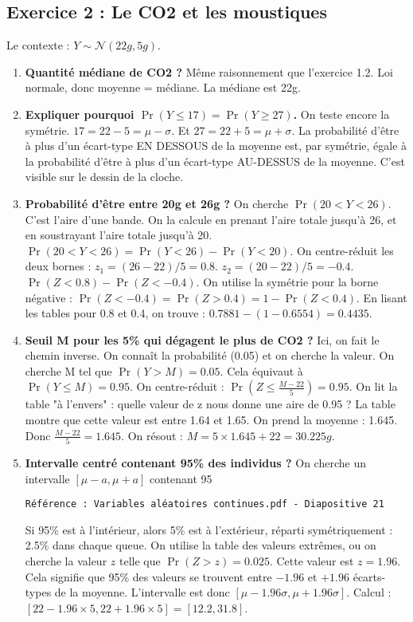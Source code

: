 \documentclass[12pt, a4paper]{article}
\newcommand{\slidenote}[1]{%
    \par\vspace{1.5ex}%
    \noindent\texttt{\small\color{gray}#1}\par\nopagebreak\vspace{1.5ex}%
}
\begin{document}
\subsection*{Exercice 2 : Le CO2 et les moustiques}
Le contexte : $Y \sim \mathcal{N}(22g, 5g)$.

\begin{enumerate}
    \item \textbf{Quantité médiane de CO2 ?} Même raisonnement que l'exercice 1.2. Loi normale, donc moyenne = médiane. La médiane est 22g.

    \item \textbf{Expliquer pourquoi $\Pr(Y \le 17) = \Pr(Y \ge 27)$.}
    On teste encore la symétrie. $17 = 22 - 5 = \mu - \sigma$. Et $27 = 22 + 5 = \mu + \sigma$.
    La probabilité d'être à plus d'un écart-type EN DESSOUS de la moyenne est, par symétrie, égale à la probabilité d'être à plus d'un écart-type AU-DESSUS de la moyenne. C'est visible sur le dessin de la cloche.

    \item \textbf{Probabilité d'être entre 20g et 26g ?}
    On cherche $\Pr(20 < Y < 26)$. C'est l'aire d'une bande. On la calcule en prenant l'aire totale jusqu'à 26, et en soustrayant l'aire totale jusqu'à 20.
    $\Pr(20 < Y < 26) = \Pr(Y < 26) - \Pr(Y < 20)$.
    On centre-réduit les deux bornes :
    $z_1 = (26-22)/5 = 0.8$. $z_2 = (20-22)/5 = -0.4$.
    $\Pr(Z < 0.8) - \Pr(Z < -0.4)$.
    On utilise la symétrie pour la borne négative : $\Pr(Z < -0.4) = \Pr(Z > 0.4) = 1 - \Pr(Z < 0.4)$.
    En lisant les tables pour 0.8 et 0.4, on trouve : $0.7881 - (1 - 0.6554) = 0.4435$.

    \item \textbf{Seuil M pour les 5\% qui dégagent le plus de CO2 ?}
    Ici, on fait le chemin inverse. On connaît la probabilité (0.05) et on cherche la valeur.
    On cherche M tel que $\Pr(Y > M) = 0.05$.
    Cela équivaut à $\Pr(Y \le M) = 0.95$.
    On centre-réduit : $\Pr\left(Z \le \frac{M-22}{5}\right) = 0.95$.
    On lit la table "à l'envers" : quelle valeur de z nous donne une aire de 0.95 ? La table montre que cette valeur est entre 1.64 et 1.65. On prend la moyenne : 1.645.
    Donc $\frac{M-22}{5} = 1.645$. On résout : $M = 5 \times 1.645 + 22 = 30.225g$.

    \item \textbf{Intervalle centré contenant 95\% des individus ?}
    On cherche un intervalle $[\mu-a, \mu+a]$ contenant 95%
    \slidenote{Référence : Variables aléatoires continues.pdf - Diapositive 21}
    Si 95\% est à l'intérieur, alors 5\% est à l'extérieur, réparti symétriquement : 2.5\% dans chaque queue.
    On utilise la table des valeurs extrêmes, ou on cherche la valeur $z$ telle que $\Pr(Z > z) = 0.025$. Cette valeur est $z=1.96$.
    Cela signifie que 95\% des valeurs se trouvent entre $-1.96$ et $+1.96$ écarts-types de la moyenne.
    L'intervalle est donc $[\mu - 1.96\sigma, \mu + 1.96\sigma]$.
    Calcul : $[22 - 1.96 \times 5, 22 + 1.96 \times 5] = [12.2, 31.8]$.
\end{enumerate}
\end{document}
